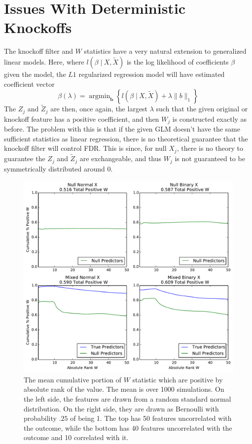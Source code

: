 \documentclass[11pt]{article}
\newcommand{\st}{ \; \big | \:}
\theoremstyle{definition}
\DeclareMathOperator*{\argmin}{arg\min}
\begin{document}
\section{Issues With Deterministic Knockoffs} 
    The knockoff filter and $W$ statistics have a very natural extension to generalized linear models. Here, where $l(\beta\st X, \tilde X)$ is the log likelihood of coefficients $\beta$ given the model, the $L1$ regularized regression model will have estimated coefficient vector
    \[ \beta(\lambda) = \argmin_\mathbf b \left\{l(\beta\st X, \tilde X) + \lambda\|b\|_1 \right\}\]
    The $Z_j$ and $\tilde Z_j$ are then, once again, the largest $\lambda$ such that the given original or knockoff feature has a positive coefficient, and then $W_j$ is constructed exactly as before. The problem with this is that if the given GLM doesn't have the same sufficient statistics as linear regression, there is no theoretical guarantee that the knockoff filter will control FDR. This is since, for null $X_j$, there is no theory to guarantee the $Z_j$ and $\tilde Z_j$ are exchangeable, and thus $W_j$ is not guaranteed to be symmetrically distributed around $0$. \par
    \begin{figure}[h]
        \begin{center}
        \includegraphics[width=14cm]{images/entryrate_original_logit}
    \end{center}
        \caption{The mean cumulative portion of $W$ statistic which are positive by absolute rank of the value. The mean is over 1000 simulations. On the left side, the features are drawn from a random standard normal distribution. On the right side, they are drawn as Bernoulli with probability $.25$ of being 1. The top has 50 features uncorrelated with the outcome, while the bottom has 40 features uncorrelated with the outcome and 10 correlated with it.}
    \end{figure}
 
\end{document}

